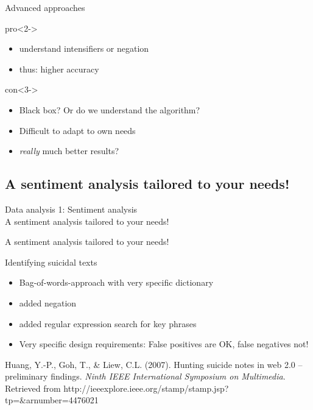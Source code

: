 \documentclass{beamer}
\begin{document}
\begin{frame}{Advanced approaches}
	\begin{block}{pro}<2->
		\begin{itemize}
			\item understand intensifiers or negation
			\item thus: higher accuracy
		\end{itemize}
	\end{block}
	\begin{block}{con}<3->
		\begin{itemize}
			\item Black box? Or do we understand the algorithm?
			\item Difficult to adapt to own needs
			\item \emph{really} much better results?
		\end{itemize}
	\end{block}
\end{frame}



\subsection{A sentiment analysis tailored to your needs!}
\begin{frame}
	Data analysis 1: Sentiment analysis\\
	A sentiment analysis tailored to your needs!
\end{frame}




\begin{frame}{A sentiment analysis tailored to your needs!}
	\begin{block}{Identifying suicidal texts}
		\begin{itemize}
			\item Bag-of-words-approach with very specific dictionary
			\item added negation
			\item added regular expression search for key phrases
			\item Very specific design requirements: False positives are OK, false negatives not!
		\end{itemize}
	\end{block}
	\par
	\tiny{Huang, Y.-P., Goh, T., \& Liew, C.L. (2007). Hunting suicide notes in web 2.0 – preliminary findings. \emph{Ninth IEEE International Symposium on Multimedia}. Retrieved from http://ieeexplore.ieee.org/stamp/stamp.jsp?tp=\&arnumber=4476021}\\
\end{frame}
\end{document}
